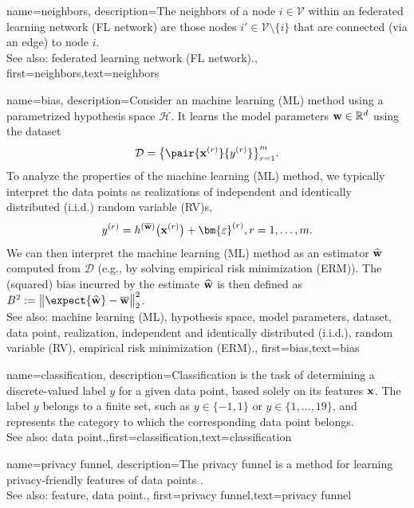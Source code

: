 {
	name={neighbors},
	description={The neighbors of a node $i \in \mathcal{V}$ 
	within an federated learning network (FL network) are those nodes $i' \in \mathcal{V} \setminus \{ i\}$ that are connected (via an edge) to node $i$.
				\\ 
		See also: federated learning network (FL network).},
	first={neighbors},text={neighbors} 
}

{
	name={bias},
	description={Consider an machine learning (ML) method using a parametrized hypothesis space $\mathcal{H}$. 
		It learns the model parameters ${\bf w} \in \mathbb{R}^{d}$ using the dataset $$ \mathcal{D}=\big\{ \pair{{\bf x}^{(r)}}{y^{(r)}} \big\}_{r=1}^{m}.$$ 
		To analyze the properties of the machine learning (ML) method, we typically interpret the data points as realizations 
		of independent and identically distributed (i.i.d.) random variable (RV)s, $$ y^{(r)} = h^{(\overline{{\bf w}})}\big( {\bf x}^{(r)} \big) + \bm{\varepsilon}^{(r)}, r=1,\ldots,m.$$ 
		We can then interpret the machine learning (ML) method as an estimator $\widehat{{\bf w}}$ 
		computed from $\mathcal{D}$ (e.g., by solving empirical risk minimization (ERM)). The (squared) bias incurred by the estimate $\widehat{{\bf w}}$ 
		is then defined as $B^{2} := \big\| \expect \{ \widehat{{\bf w}}  \}- \overline{{\bf w}}\big\|_{2}^{2}$.
					\\ 
		See also: machine learning (ML), hypothesis space, model parameters, dataset, data point, realization, independent and identically distributed (i.i.d.), random variable (RV), empirical risk minimization (ERM).},
first={bias},text={bias} 
}

{name={classification},
 description={Classification is the task of determining a 
 	discrete-valued label $y$ for a given data point, based solely on its 
 	features ${\bf x}$. The label $y$ belongs to a finite set, such as 
 	$y \in \{-1,1\}$ or $y \in \{1,\ldots,19\}$, and represents the 
 	category to which the corresponding data point belongs.
				\\ 
		See also: data point.},first={classification},text={classification} 
}



{name={privacy funnel},
 description={The privacy funnel is a method for learning privacy-friendly features 
	of data points \cite{PrivacyFunnel}.
				\\ 
		See also: feature, data point.},
 first={privacy funnel},text={privacy funnel} 
}




